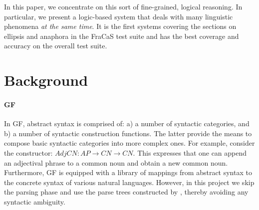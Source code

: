 \documentclass[11pt]{article}
\begin{document}
In this paper, we concentrate on this sort of fine-grained, logical
reasoning. In particular, we present a logic-based system that deals
with many linguistic phenomena \emph{at the same time}. It is the
first systems covering the sections on ellipsis and anaphora in the
FraCaS test suite and has the best coverage and accuracy on the
overall test suite.

\section{Background}

\paragraph{GF}
In GF, abstract syntax is comprised of: a) a number of syntactic
categories, and b) a number of syntactic construction functions. The latter
provide the means to compose basic syntactic categories into more complex
ones.  For example, consider the constructor: $AdjCN : AP → CN → CN$. This  expresses
that one can append an adjectival phrase to a common noun and obtain
a new common noun. Furthermore,  GF is equipped  with a library of mappings from abstract
syntax to the concrete syntax of various natural languages.
However, in this project we skip the
parsing phase and use the parse trees constructed by \citet{Ljunglof:2012},
thereby avoiding any syntactic ambiguity. 
\end{document}
